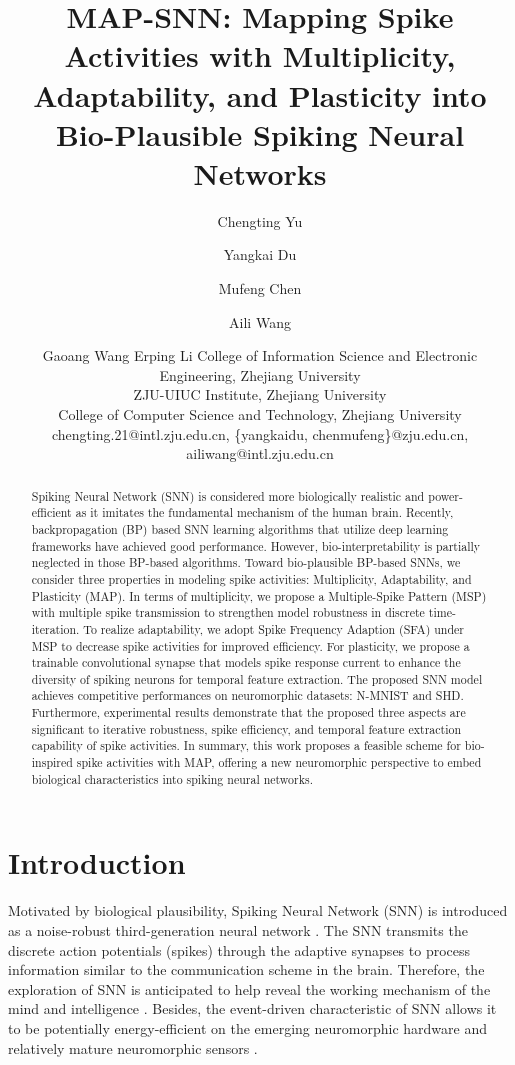 \documentclass{article}
\title{MAP-SNN: Mapping Spike Activities with Multiplicity, Adaptability, and Plasticity into Bio-Plausible Spiking Neural Networks}
\author{
Chengting Yu
\and
Yangkai Du\and
Mufeng Chen\and
Aili Wang\and
Gaoang Wang\And
Erping Li
\affiliations
College of Information Science and Electronic Engineering, Zhejiang University\\
ZJU-UIUC Institute, Zhejiang University\\
College of Computer Science and Technology, Zhejiang University
\emails
chengting.21@intl.zju.edu.cn,
\{yangkaidu, chenmufeng\}@zju.edu.cn,
ailiwang@intl.zju.edu.cn
}
\begin{document}
\maketitle

\begin{abstract}
Spiking Neural Network (SNN) is considered more biologically realistic and power-efficient as it imitates the fundamental mechanism of the human brain.
Recently, backpropagation (BP) based SNN learning algorithms that utilize deep learning frameworks have achieved good performance.
However, bio-interpretability is partially neglected in those BP-based algorithms.
Toward bio-plausible BP-based SNNs, we consider three properties in modeling spike activities: Multiplicity, Adaptability, and Plasticity (MAP).
In terms of multiplicity, we propose a Multiple-Spike Pattern (MSP) with multiple spike transmission to strengthen model robustness in discrete time-iteration. 
To realize adaptability, we adopt Spike Frequency Adaption (SFA) under MSP to decrease spike activities for improved efficiency.
For plasticity, we propose a trainable convolutional synapse that models spike response current to enhance the diversity of spiking neurons for temporal feature extraction.
The proposed SNN model achieves competitive performances on neuromorphic datasets: N-MNIST and SHD. 
Furthermore, experimental results demonstrate that the proposed three aspects are significant to iterative robustness, spike efficiency, and temporal feature extraction capability of spike activities.
In summary, this work proposes a feasible scheme for bio-inspired spike activities with MAP, offering a new neuromorphic perspective to embed biological characteristics into spiking neural networks.




\end{abstract}



\section{Introduction}


Motivated by biological plausibility, Spiking Neural Network (SNN) is introduced as a noise-robust third-generation neural network \cite{maass_networks_1997}. The SNN transmits the discrete action potentials (spikes) through the adaptive synapses to process information similar to the communication scheme in the brain. Therefore, the exploration of SNN is anticipated to help reveal the working mechanism of the mind and intelligence \cite{ghosh-dastidar_spiking_2009}. 
Besides, the event-driven characteristic of SNN allows it to be potentially energy-efficient on the emerging neuromorphic hardware and relatively mature neuromorphic sensors \cite{vanarse_review_2016}.
\end{document}
